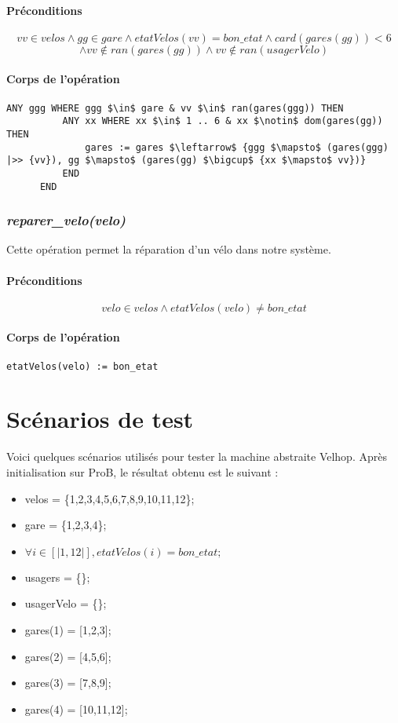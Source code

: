 \documentclass[12pt]{article}
\begin{document}
\paragraph{Préconditions}
\[ vv \in velos \land gg \in gare \land etatVelos(vv) = bon\_etat \land card(gares(gg))<6 \]
\[\land vv \notin ran(gares(gg)) \land vv \notin ran(usagerVelo)\]
\paragraph{Corps de l'opération}
\textbf{}
\begin{lstlisting}[mathescape]
      ANY ggg WHERE ggg $\in$ gare & vv $\in$ ran(gares(ggg)) THEN
          ANY xx WHERE xx $\in$ 1 .. 6 & xx $\notin$ dom(gares(gg)) THEN
              gares := gares $\leftarrow$ {ggg $\mapsto$ (gares(ggg) |>> {vv}), gg $\mapsto$ (gares(gg) $\bigcup$ {xx $\mapsto$ vv})}
          END
      END
\end{lstlisting}

\subsubsection{\textit{reparer\_velo(velo)}}
Cette opération permet la réparation d'un vélo dans notre système.
\paragraph{Préconditions}
\[ velo \in velos \land etatVelos(velo) \neq bon\_etat \]
\paragraph{Corps de l'opération}
\textbf{}
\begin{lstlisting}[mathescape]
  etatVelos(velo) := bon_etat
\end{lstlisting}
\newpage
\section{Scénarios de test}
Voici quelques scénarios utilisés pour tester la machine abstraite Velhop. Après initialisation sur ProB, le résultat obtenu est le suivant :
\begin{itemize}
  \item velos = \{1,2,3,4,5,6,7,8,9,10,11,12\};
  \item gare = \{1,2,3,4\};
  \item $ \forall i \in [|1,12|], etatVelos(i) = bon\_etat;$
  \item usagers = \{\};
  \item usagerVelo = \{\};
  \item gares(1) = [1,2,3];
  \item gares(2) = [4,5,6];
  \item gares(3) = [7,8,9];
  \item gares(4) = [10,11,12];
\end{itemize}
\end{document}

